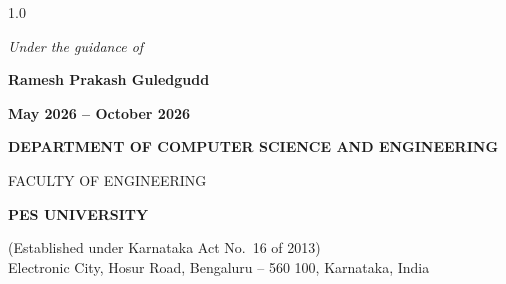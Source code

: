 \documentclass[12pt,a4paper]{report}
\begin{document}
\begin{titlepage}
\begin{spacing}{1.0}
\vspace{0.5em}
{\normalsize\itshape Under the guidance of\par}
\vspace{0.2em}
{\large\bfseries Ramesh Prakash Guledgudd\par}

\vspace{0.6em}
{\normalsize\bfseries\color{pesmaroon} May 2026 -- October 2026\par}

\vfill

{\normalsize\bfseries DEPARTMENT OF COMPUTER SCIENCE AND ENGINEERING\par}
{\normalsize FACULTY OF ENGINEERING\par}
{\large\bfseries PES UNIVERSITY\par}
{\footnotesize (Established under Karnataka Act No.\ 16 of 2013)\\
Electronic City, Hosur Road, Bengaluru -- 560 100, Karnataka, India\par}
\end{spacing}
\end{titlepage}
\end{document}
